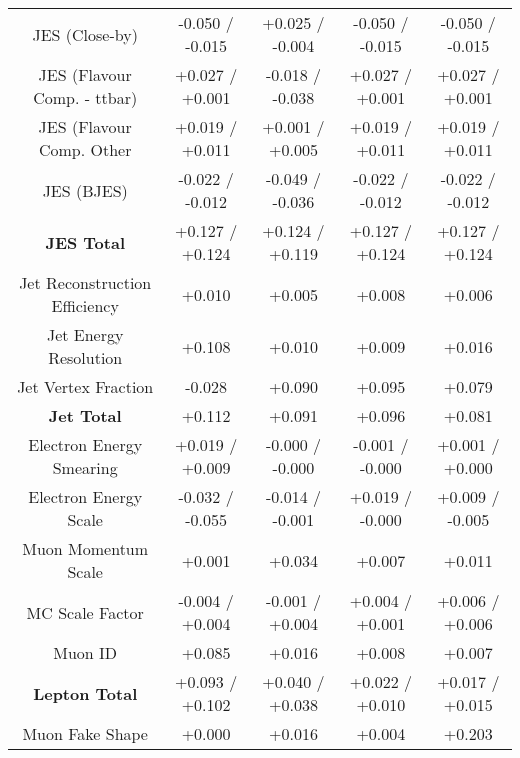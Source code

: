 \begin{table}[htbp]
\begin{center}
\begin{tabular}{|c|c|c|c|c|}
JES (Close-by)                        &-0.050   / -0.015   & +0.025   / -0.004   & -0.050   / -0.015   & -0.050   / -0.015  \\
JES (Flavour Comp. - ttbar)           &+0.027   / +0.001   & -0.018   / -0.038   & +0.027   / +0.001   & +0.027   / +0.001  \\
JES (Flavour Comp. Other              &+0.019   / +0.011   & +0.001   / +0.005   & +0.019   / +0.011   & +0.019   / +0.011  \\
JES (BJES)                            &-0.022   / -0.012   & -0.049   / -0.036   & -0.022   / -0.012   & -0.022   / -0.012  \\
\hline
\textbf{JES Total}                    &+0.127   / +0.124   & +0.124   / +0.119   & +0.127   / +0.124   & +0.127   / +0.124  \\
\hline
Jet Reconstruction Efficiency         &+0.010              & +0.005              & +0.008              & +0.006             \\
Jet Energy Resolution                 &+0.108              & +0.010              & +0.009              & +0.016             \\
Jet Vertex Fraction                   &-0.028              & +0.090              & +0.095              & +0.079             \\
\hline
\textbf{Jet Total}                    &+0.112              & +0.091              & +0.096              & +0.081             \\
\hline
Electron Energy Smearing              &+0.019   / +0.009   & -0.000   / -0.000   & -0.001   / -0.000   & +0.001   / +0.000  \\
Electron Energy Scale                 &-0.032   / -0.055   & -0.014   / -0.001   & +0.019   / -0.000   & +0.009   / -0.005  \\
Muon Momentum Scale                   &+0.001              & +0.034              & +0.007              & +0.011             \\
MC Scale Factor                       &-0.004   / +0.004   & -0.001   / +0.004   & +0.004   / +0.001   & +0.006   / +0.006  \\
Muon ID                               &+0.085              & +0.016              & +0.008              & +0.007             \\
\hline
\textbf{Lepton Total}                 &+0.093   / +0.102   & +0.040   / +0.038   & +0.022   / +0.010   & +0.017   / +0.015  \\
\hline
Muon Fake Shape                       &+0.000              & +0.016              & +0.004              & +0.203             \\

\end{tabular}
\end{center}
\end{table}
